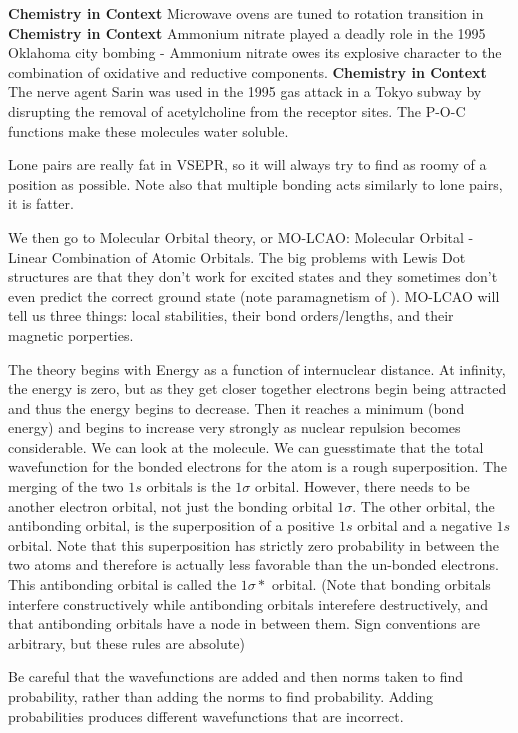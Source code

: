 \documentclass{report}
\begin{document}
\begin{center}
\textbf{Chemistry in Context} Microwave ovens are tuned to rotation transition in 
\textbf{Chemistry in Context} Ammonium nitrate played a deadly role in the 1995 Oklahoma city bombing - Ammonium nitrate owes its explosive character to the combination of oxidative and reductive components.
\textbf{Chemistry in Context} The nerve agent Sarin was used in the 1995 gas attack in a Tokyo subway by disrupting the removal of acetylcholine from the receptor sites. The P-O-C functions make these molecules water soluble. 
\end{center}

Lone pairs are really fat in VSEPR, so it will always try to find as roomy of a position as possible. Note also that multiple bonding acts similarly to lone pairs, it is fatter.

We then go to Molecular Orbital theory, or MO-LCAO: Molecular Orbital - Linear Combination of Atomic Orbitals. The big problems with Lewis Dot structures are that they don't work for excited states and they sometimes don't even predict the correct ground state (note paramagnetism of ). MO-LCAO will tell us three things: local stabilities, their bond orders/lengths, and their magnetic porperties.

The theory begins with Energy as a function of internuclear distance. At infinity, the energy is zero, but as they get closer together electrons begin being attracted and thus the energy begins to decrease. Then it reaches a minimum (bond energy) and begins to increase very strongly as nuclear repulsion becomes considerable. We can look at the  molecule. We can guesstimate that the total wavefunction for the bonded electrons for the  atom is a rough superposition. The merging of the two $1s$ orbitals is the $1\sigma$ orbital. However, there needs to be another electron orbital, not just the bonding orbital $1\sigma$. The other orbital, the antibonding orbital, is the superposition of a positive $1s$ orbital and a negative $1s$ orbital. Note that this superposition has strictly zero probability in between the two atoms and therefore is actually less favorable than the un-bonded electrons. This antibonding orbital is called the $1\sigma*$ orbital. (Note that bonding orbitals interfere constructively while antibonding orbitals interefere destructively, and that antibonding orbitals have a node in between them. Sign conventions are arbitrary, but these rules are absolute)

Be careful that the wavefunctions are added and then norms taken to find probability, rather than adding the norms to find probability. Adding probabilities produces different wavefunctions that are incorrect.
\end{document}
